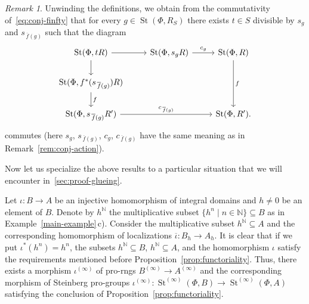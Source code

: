 \documentclass[oneside, 11pt]{amsart}
\numberwithin{equation}{section}
\newcommand{\St}{\mathop{\mathrm{St}}\nolimits}
\theoremstyle{definition}
\theoremstyle{definition}
\theoremstyle{remark}
\newtheorem{rem}[lemma]{Remark}
\begin{document}
\begin{rem} \label{rem:functoriality}
 Unwinding the definitions, we obtain from the commutativity of~\eqref{eq:conj-finfty} that for every $g \in \St(\Phi, R_S)$ there exists $t \in S$ divisible by $s_g$ and $s_{\,\overline f(g)}$ such that the diagram 
 \[ \begin{tikzcd} \St(\Phi, tR) \ar{r} \ar{d} & \St(\Phi, s_g R) \ar{r}{c_{g}} & \St(\Phi, R) \ar{dd}{f} \\
                   \St(\Phi, f^*(s_{\,\overline{f}(g)})R) \ar{d}{f}   & & \\
                   \St(\Phi, s_{\,\overline{f}(g)} R')   \ar{rr}{c_{\,\overline{f}(g)}} & & \St(\Phi, R'). \end{tikzcd} \]
commutes (here $s_g$, $s_{\,\overline{f}(g)}$, $c_g$, $c_{\,\overline{f}(g)}$ have the same meaning as in Remark~\ref{rem:conj-action}).
\end{rem}

Now let us specialize the above results to a particular situation that we will encounter in~\cref{sec:proof-glueing}.


Let $\iota \colon B \to A$ be an injective homomorphism of integral domains and $h \neq 0$ be an element of $B$. 
Denote by $h^{\mathbb{N}}$ the multiplicative subset $\{ h^n \mid n \in \mathbb{N} \} \subseteq B$ as in Example~\ref{main-example}\,c). 
Consider the multiplicative subset $h^\mathbb{N} \subseteq A$ and the corresponding homomorphism of localizations $\overline{\iota} \colon B_h \to A_{h}$. It is clear that if we put $\iota^*(h^n) = h^n$, the subsets $h^\mathbb{N} \subseteq B$, $h^\mathbb{N} \subseteq A$, and the homomorphism $\iota$ satisfy the requirements mentioned before Proposition~\ref{prop:functoriality}. Thus, there exists a morphism $\iota^{(\infty)}$ of pro-rngs $B^{(\infty)} \to A^{(\infty)}$ and the corresponding morphism of Steinberg pro-groups $\iota^{(\infty)}\colon\St^{(\infty)}(\Phi, B) \to \St^{(\infty)}(\Phi, A)$ satisfying the conclusion of Proposition~\ref{prop:functoriality}.
\end{document}
